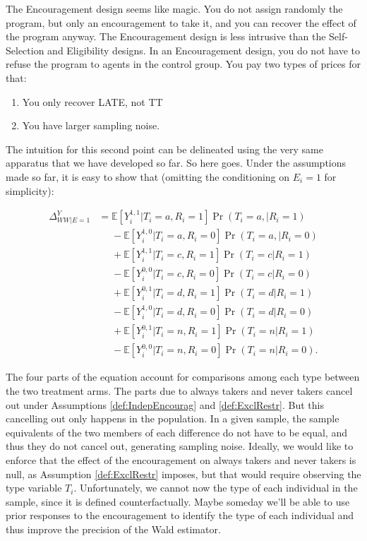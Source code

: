 \documentclass[]{book}
\providecommand{\tightlist}{%
  \setlength{\itemsep}{0pt}\setlength{\parskip}{0pt}}
\newcommand{\esp}[1]{\mathbb{E}[ #1 ]}
\theoremstyle{definition}
\theoremstyle{definition}
\theoremstyle{definition}
\theoremstyle{remark}
\let\BeginKnitrBlock\begin \let\EndKnitrBlock\end
\begin{document}
\BeginKnitrBlock{remark}
\iffalse{} {Remark. } \fi{}The Encouragement design seems like magic.
You do not assign randomly the program, but only an encouragement to take it, and you can recover the effect of the program anyway.
The Encouragement design is less intrusive than the Self-Selection and Eligibility designs.
In an Encouragement design, you do not have to refuse the program to agents in the control group.
You pay two types of prices for that:
\EndKnitrBlock{remark}

\begin{enumerate}
\def\labelenumi{\arabic{enumi}.}
\tightlist
\item
  You only recover LATE, not TT
\item
  You have larger sampling noise.
\end{enumerate}

The intuition for this second point can be delineated using the very same apparatus that we have developed so far.
So here goes.
Under the assumptions made so far, it is easy to show that (omitting the conditioning on \(E_i=1\) for simplicity):

\begin{align*}
  \Delta^Y_{WW|E=1} & = \esp{Y_i^{1,1}|T_i=a,R_i=1}\Pr(T_i=a,|R_i=1)\\
                    & \phantom{=}-\esp{Y_i^{1,0}|T_i=a,R_i=0}\Pr(T_i=a,|R_i=0)\\
                    & \phantom{=}+ \esp{Y_i^{1,1}|T_i=c,R_i=1}\Pr(T_i=c|R_i=1)\\
                    & \phantom{=}-\esp{Y_i^{0,0}|T_i=c,R_i=0}\Pr(T_i=c|R_i=0)\\
                    & \phantom{=}+ \esp{Y_i^{0,1}|T_i=d,R_i=1}\Pr(T_i=d|R_i=1)\\
                    & \phantom{=}-\esp{Y_i^{1,0}|T_i=d,R_i=0}\Pr(T_i=d|R_i=0)\\
                    & \phantom{=}+ \esp{Y_i^{0,1}|T_i=n,R_i=1}\Pr(T_i=n|R_i=1)\\
                    & \phantom{=}-\esp{Y_i^{0,0}|T_i=n,R_i=0}\Pr(T_i=n|R_i=0).
\end{align*}

The four parts of the equation account for comparisons among each type between the two treatment arms.
The parts due to always takers and never takers cancel out under Assumptions \ref{def:IndepEncourag} and \ref{def:ExclRestr}.
But this cancelling out only happens in the population.
In a given sample, the sample equivalents of the two members of each difference do not have to be equal, and thus they do not cancel out, generating sampling noise.
Ideally, we would like to enforce that the effect of the encouragement on always takers and never takers is null, as Assumption \ref{def:ExclRestr} imposes, but that would require observing the type variable \(T_i\).
Unfortunately, we cannot now the type of each individual in the sample, since it is defined counterfactually.
Maybe someday we'll be able to use prior responses to the encouragement to identify the type of each individual and thus improve the precision of the Wald estimator.
\end{document}
